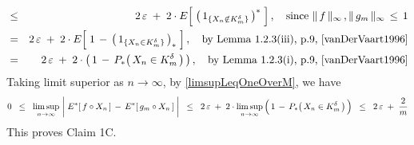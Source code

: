 \begin{eqnarray*}
\\
& \leq &
	2\,\varepsilon
	\;+\;
	2 \cdot E\!\left[\; \left(\,1_{\{X_{n} \notin K^{\delta}_{m}\}}\,\right)^{*} \;\right],
	\quad
	\textnormal{since $\Vert\,f\,\Vert_{\infty}\,, \Vert\,g_{m}\,\Vert_{\infty} \,\leq\, 1$}
\\
& = &
	2\,\varepsilon
	\;+\;
	2 \cdot E\!\left[\; 1 \,-\, \left(\,1_{\{X_{n} \in K^{\delta}_{m}\}}\,\right)_{*} \;\right],
	\quad
	\textnormal{by Lemma 1.2.3(iii), p.9, \cite{vanDerVaart1996}}
\\
& = &
	2\,\varepsilon
	\;+\;
	2 \cdot \left(\, 1 \,-\, P_{*}\!\left(\,X_{n} \in K^{\delta}_{m}\,\right) \,\right),
	\quad
	\textnormal{by Lemma 1.2.3(i), p.9, \cite{vanDerVaart1996}}
\end{eqnarray*}
Taking limit superior as $n \longrightarrow \infty$, by \eqref{limsupLeqOneOverM}, we have
\begin{equation*}
0
\;\; \leq \;\;
	\underset{n\rightarrow\infty}{\limsup}\,
	\left\vert\; \overset{{\color{white}-}}{E^{*}}[\,f \circ X_{n}\,] \,-\, E^{*}[\,g_{m} \circ X_{n}\,] \;\right\vert
\;\; \leq \;\;
	2\,\varepsilon
	\;+\;
	2 \cdot \underset{n\rightarrow\infty}{\limsup}\left(\,
		\overset{{\color{white}.}}{1} \,-\, P_{*}\!\left(\,X_{n} \in K^{\delta}_{m}\,\right)
		\,\right)
\;\; \leq \;\;
	2\,\varepsilon
	\;+\;
	\dfrac{2}{m}
\end{equation*}
This proves Claim 1C.


